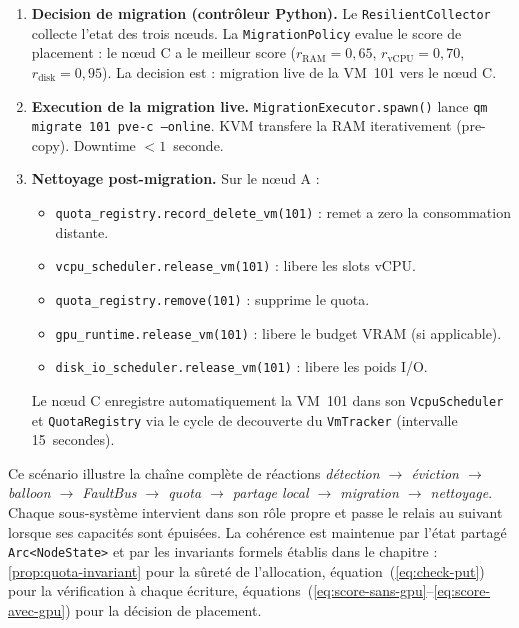 \begin{enumerate}
    \item \textbf{Decision de migration (contrôleur Python).} Le \texttt{ResilientCollector} collecte l'etat des trois nœuds. La \texttt{MigrationPolicy} evalue le score de placement : le nœud C a le meilleur score ($r_{\text{RAM}} = 0{,}65$, $r_{\text{vCPU}} = 0{,}70$, $r_{\text{disk}} = 0{,}95$). La decision est : migration live de la VM~101 vers le nœud C.

    \item \textbf{Execution de la migration live.} \texttt{MigrationExecutor.spawn()} lance \texttt{qm migrate 101 pve-c --online}. KVM transfere la RAM iterativement (pre-copy). Downtime $< 1$~seconde.

    \item \textbf{Nettoyage post-migration.} Sur le nœud A :
    \begin{itemize}
        \item \texttt{quota\_registry.record\_delete\_vm(101)} : remet a zero la consommation distante.
        \item \texttt{vcpu\_scheduler.release\_vm(101)} : libere les slots vCPU.
        \item \texttt{quota\_registry.remove(101)} : supprime le quota.
        \item \texttt{gpu\_runtime.release\_vm(101)} : libere le budget VRAM (si applicable).
        \item \texttt{disk\_io\_scheduler.release\_vm(101)} : libere les poids I/O.
    \end{itemize}
    Le nœud C enregistre automatiquement la VM~101 dans son \texttt{VcpuScheduler} et \texttt{QuotaRegistry} via le cycle de decouverte du \texttt{VmTracker} (intervalle 15~secondes).
\end{enumerate}

Ce scénario illustre la chaîne complète de réactions \emph{détection $\to$ éviction $\to$ balloon $\to$ FaultBus $\to$ quota $\to$ partage local $\to$ migration $\to$ nettoyage}. Chaque sous-système intervient dans son rôle propre et passe le relais au suivant lorsque ses capacités sont épuisées. La cohérence est maintenue par l'état partagé \texttt{Arc<NodeState>} et par les invariants formels établis dans le chapitre : \autoref{prop:quota-invariant} pour la sûreté de l'allocation, équation~(\ref{eq:check-put}) pour la vérification à chaque écriture, équations~(\ref{eq:score-sans-gpu}--\ref{eq:score-avec-gpu}) pour la décision de placement.

